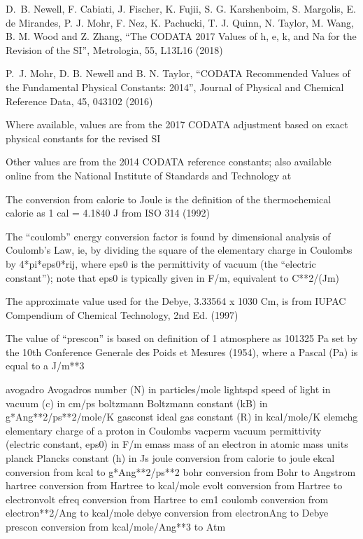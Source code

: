 \documentclass[letterpaper,11pt,english]{sphinxmanual}
\begin{document}

D. B. Newell, F. Cabiati, J. Fischer, K. Fujii, S. G. Karshenboim,
S. Margolis, E. de Mirandes, P. J. Mohr, F. Nez, K. Pachucki,
T. J. Quinn, N. Taylor, M. Wang, B. M. Wood and Z. Zhang, “The
CODATA 2017 Values of h, e, k, and Na for the Revision of the SI”,
Metrologia, 55, L13\sphinxhyphen{}L16 (2018)

P. J. Mohr, D. B. Newell and B. N. Taylor, “CODATA Recommended
Values of the Fundamental Physical Constants: 2014”, Journal of
Physical and Chemical Reference Data, 45, 043102 (2016)

Where available, values are from the 2017 CODATA adjustment
based on exact physical constants for the revised SI

Other values are from the 2014 CODATA reference constants; also
available online from the National Institute of Standards and
Technology at 

The conversion from calorie to Joule is the definition of the
thermochemical calorie as 1 cal = 4.1840 J from ISO 31\sphinxhyphen{}4 (1992)

The “coulomb” energy conversion factor is found by dimensional
analysis of Coulomb’s Law, ie, by dividing the square of the
elementary charge in Coulombs by 4*pi*eps0*rij, where eps0 is
the permittivity of vacuum (the “electric constant”); note that
eps0 is typically given in F/m, equivalent to C**2/(J\sphinxhyphen{}m)

The approximate value used for the Debye, 3.33564 x 10\sphinxhyphen{}30 C\sphinxhyphen{}m,
is from IUPAC Compendium of Chemical Technology, 2nd Ed. (1997)

The value of “prescon” is based on definition of 1 atmosphere
as 101325 Pa set by the 10th Conference Generale des Poids et
Mesures (1954), where a Pascal (Pa) is equal to a J/m**3

\begin{sphinxVerbatim}[commandchars=\\\{\}]
avogadro        Avogadro\PYGZsq{}s number (N) in particles/mole
lightspd        speed of light in vacuum (c) in cm/ps
boltzmann       Boltzmann constant (kB) in g*Ang**2/ps**2/mole/K
gasconst        ideal gas constant (R) in kcal/mole/K
elemchg         elementary charge of a proton in Coulombs
vacperm         vacuum permittivity (electric constant, eps0) in F/m
emass           mass of an electron in atomic mass units
planck          Planck\PYGZsq{}s constant (h) in J\PYGZhy{}s
joule           conversion from calorie to joule
ekcal           conversion from kcal to g*Ang**2/ps**2
bohr            conversion from Bohr to Angstrom
hartree         conversion from Hartree to kcal/mole
evolt           conversion from Hartree to electron\PYGZhy{}volt
efreq           conversion from Hartree to cm\PYGZhy{}1
coulomb         conversion from electron**2/Ang to kcal/mole
debye           conversion from electron\PYGZhy{}Ang to Debye
prescon         conversion from kcal/mole/Ang**3 to Atm
\end{sphinxVerbatim}
\end{document}

